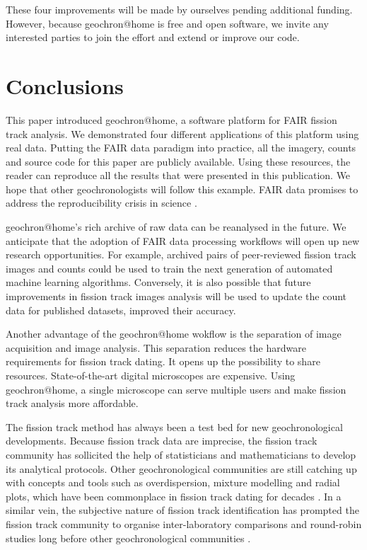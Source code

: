 \documentclass[gchron, manuscript]{copernicus}
\begin{document}
These four improvements will be made by ourselves pending additional
funding. However, because geochron@home is free and open
software, we invite any interested parties to join the effort and
extend or improve our code.

\section{Conclusions}\label{sec:conclusions}

This paper introduced geochron@home, a software platform for
FAIR fission track analysis. We demonstrated four different
applications of this platform using real data. Putting the FAIR data
paradigm into practice, all the imagery, counts and source code for
this paper are publicly available. Using these resources, the reader
can reproduce all the results that were presented in this publication.
We hope that other geochronologists will follow this example.  FAIR
data promises to address the reproducibility crisis in science
\citep{miyakawa2020}.\medskip

geochron@home's rich archive of raw data can be reanalysed in
the future. We anticipate that the adoption of FAIR data processing
workflows will open up new research opportunities. For example,
archived pairs of peer-reviewed fission track images and counts could
be used to train the next generation of automated machine learning
algorithms. Conversely, it is also possible that future improvements
in fission track images analysis will be used to update the count data
for published datasets, improved their accuracy.\medskip

Another advantage of the geochron@home wokflow is the
separation of image acquisition and image analysis. This separation
reduces the hardware requirements for fission track dating. It opens
up the possibility to share resources. State-of-the-art digital
microscopes are expensive. Using geochron@home, a single
microscope can serve multiple users and make fission track analysis
more affordable.\medskip

The fission track method has always been a test bed for new
geochronological developments.  Because fission track data are
imprecise, the fission track community has sollicited the help of
statisticians and mathematicians to develop its analytical protocols.
Other geochronological communities are still catching up with concepts
and tools such as overdispersion, mixture modelling and radial plots,
which have been commonplace in fission track dating for decades
\citep{vermeesch2019b}. In a similar vein, the subjective nature of
fission track identification has prompted the fission track community
to organise inter-laboratory comparisons and round-robin studies long
before other geochronological communities
\citep{miller1985,tamer2025}.\medskip
\end{document}

